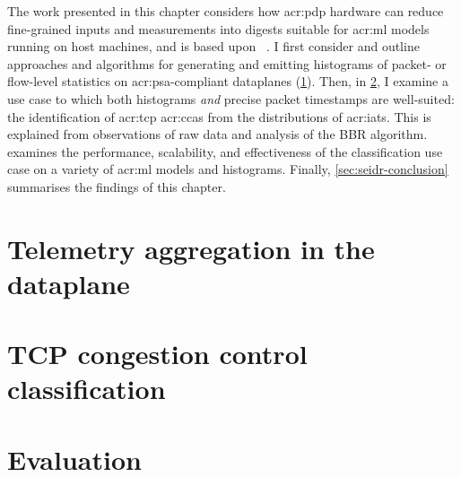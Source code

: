 The work presented in this chapter considers how \gls{acr:pdp} hardware can reduce fine-grained inputs and measurements into digests suitable for \gls{acr:ml} models running on host machines, and is based upon ~\parencite{DBLP:conf/globecom/SimpsonCP20}.
I first consider and outline approaches and algorithms for generating and emitting histograms of packet- or flow-level statistics on \gls{acr:psa}-compliant dataplanes (\cref{sec:seidr-architecture}).
Then, in \cref{sec:seidr-tcpcc}, I examine a use case to which both histograms \emph{and} precise packet timestamps are well-suited: the identification of \gls{acr:tcp} \glspl{acr:cca} from the distributions of \glspl{acr:iat}.
This is explained from observations of raw data and analysis of the BBR algorithm.
 examines the performance, scalability, and effectiveness of the classification use case on a variety of \gls{acr:ml} models and \seidr{} histograms.
Finally, \cref{sec:seidr-conclusion} summarises the findings of this chapter.

%

\section{Telemetry aggregation in the dataplane}\label{sec:seidr-architecture}


\section{TCP congestion control classification}\label{sec:seidr-tcpcc}


\section{Evaluation}\label{sec:seidr-evaluation}


% 

